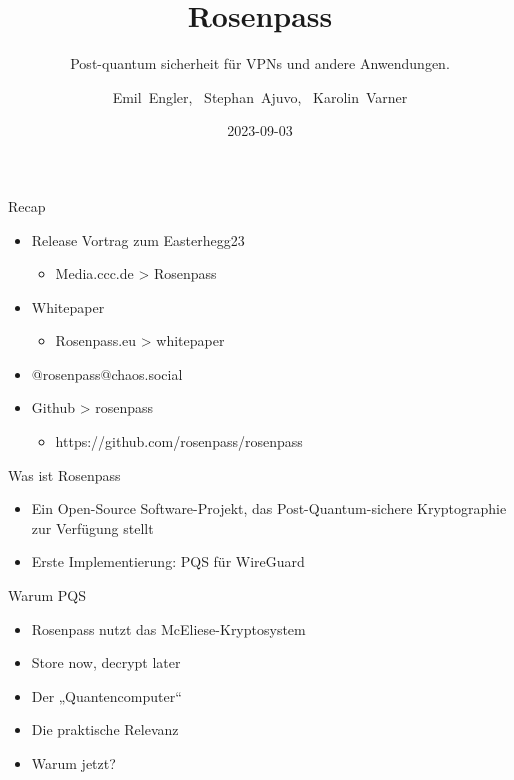 \documentclass{rosenpass-beamer}
\date{2023-09-03}
\title{Rosenpass}
\subtitle{
  Post-quantum sicherheit für VPNs und andere Anwendungen.
}
\author{Emil~Engler, \ Stephan~Ajuvo, \ Karolin~Varner}
\begin{document}
\maketitle


	\begin{frame}{Recap}
		\begin{itemize}
			\item Release Vortrag zum Easterhegg23
				\begin{itemize}
					\item Media.ccc.de > Rosenpass
				\end{itemize}
			
			\item Whitepaper
				\begin{itemize}
					\item Rosenpass.eu > whitepaper
				\end{itemize}
			
			\item @rosenpass@chaos.social
	
			\item Github > rosenpass
				\begin{itemize}
					\item https://github.com/rosenpass/rosenpass
				\end{itemize}
		\end{itemize}
	\end{frame}
		
		
	\begin{frame}{Was ist Rosenpass}
		\begin{itemize}
			\item Ein Open-Source Software-Projekt, das Post-Quantum-sichere Kryptographie zur Verfügung stellt
			\item Erste Implementierung: PQS für WireGuard
		\end{itemize}
	\end{frame}		


	\begin{frame}{Warum PQS}
		\begin{itemize}
			\item Rosenpass nutzt das McEliese-Kryptosystem
			\item Store now, decrypt later
			\item Der „Quantencomputer“
			\item Die praktische Relevanz
			\item Warum jetzt?
		\end{itemize}
	\end{frame}
\end{document}
